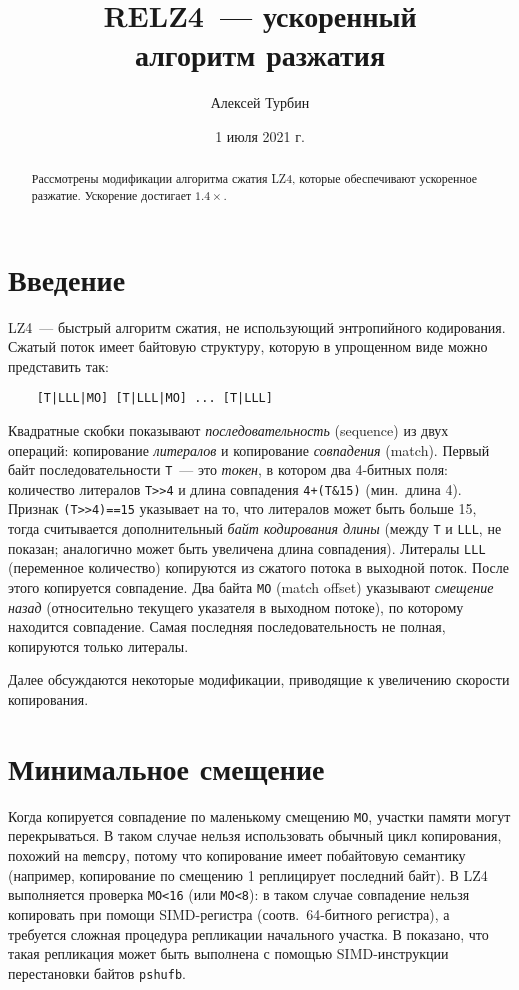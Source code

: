 \documentclass[russian,a4paper,12pt]{article}
\begin{document}
\title{RELZ4~--- ускоренный\\алгоритм разжатия}
\author{Алексей Турбин}
\date{1 июля 2021 г.}
\maketitle

\begin{abstract}
Рассмотрены модификации алгоритма сжатия LZ4, которые обеспечивают ускоренное разжатие.
Ускорение достигает $1.4\times$.
\end{abstract}

\section{Введение}
LZ4~--- быстрый алгоритм сжатия, не использующий энтропийного кодирования.
Сжатый поток имеет байтовую структуру, которую в упрощенном виде можно представить так:
\begin{verbatim}
    [T|LLL|MO] [T|LLL|MO] ... [T|LLL]
\end{verbatim}
Квадратные скобки показывают \emph{последовательность} (sequence) из двух операций:
копирование \emph{литералов} и копирование \emph{совпадения} (match).  Первый
байт последовательности \verb|T|~--- это \emph{токен}, в котором два 4-битных поля:
количество литералов \verb|T>>4| и длина совпадения \verb|4+(T&15)| (мин.~длина 4).
Признак \verb|(T>>4)==15| указывает на то, что литералов может быть больше 15,
тогда считывается дополнительный \emph{байт кодирования длины} (между \verb|T|
и \verb|LLL|, не показан; аналогично может быть увеличена длина совпадения).
Литералы \verb|LLL| (переменное количество) копируются из сжатого потока в выходной поток.
После этого копируется совпадение. Два байта \verb|MO| (match offset) указывают
\emph{смещение назад} (относительно текущего указателя в выходном потоке),
по которому находится совпадение.  Самая последняя последовательность не полная,
копируются только литералы.

Далее обсуждаются некоторые модификации, приводящие к увеличению скорости копирования.

\section{Минимальное смещение}
Когда копируется совпадение по маленькому смещению \verb|MO|, участки памяти
могут перекрываться.  В таком случае нельзя использовать обычный цикл копирования,
похожий на \verb|memcpy|, потому что копирование имеет побайтовую семантику
(например, копирование по смещению 1 реплицирует последний байт).
В LZ4 выполняется проверка \verb|MO<16| (или \verb|MO<8|): в таком случае
совпадение нельзя копировать при помощи SIMD-регистра (соотв.~64-битного
регистра), а требуется сложная процедура репликации начального участка.
В \cite{yandex2019} показано, что такая репликация может быть выполнена
с помощью SIMD-инструкции перестановки байтов \verb|pshufb|.
\end{document}

